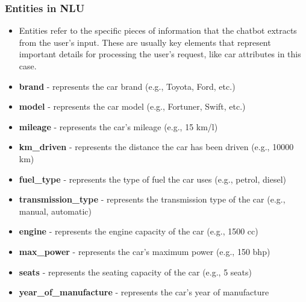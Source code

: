 \documentclass{beamer}
\begin{document}
\begin{frame}
	\frametitle{Entities in NLU}
	
	\begin{itemize}
		\item
Entities refer to the specific pieces of information that the chatbot extracts from the user's input. These are usually key elements that represent important details for processing the user's request, like car attributes in this case.
		
		\item \textbf{brand} - represents the car brand (e.g., Toyota, Ford, etc.)
		\item \textbf{model} - represents the car model (e.g., Fortuner, Swift, etc.)
		\item \textbf{mileage} - represents the car's mileage (e.g., 15 km/l)
		\item \textbf{km\_driven} - represents the distance the car has been driven (e.g., 10000 km)
		\item \textbf{fuel\_type} - represents the type of fuel the car uses (e.g., petrol, diesel)
		\item \textbf{transmission\_type} - represents the transmission type of the car (e.g., manual, automatic)
		\item \textbf{engine} - represents the engine capacity of the car (e.g., 1500 cc)
		\item \textbf{max\_power} - represents the car's maximum power (e.g., 150 bhp)
		\item \textbf{seats} - represents the seating capacity of the car (e.g., 5 seats)
		\item \textbf{year\_of\_manufacture} - represents the car's year of manufacture
	\end{itemize}
	
\end{frame}
\end{document}
